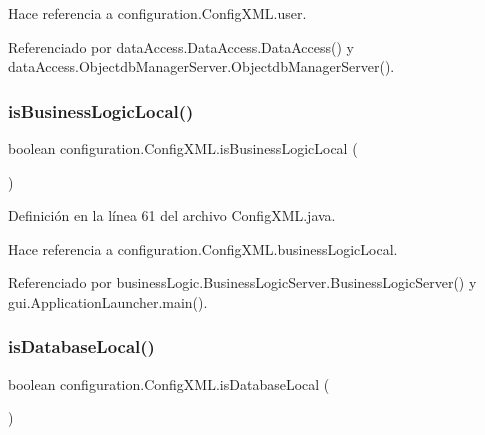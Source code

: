 Hace referencia a configuration.\+Config\+X\+M\+L.\+user.



Referenciado por data\+Access.\+Data\+Access.\+Data\+Access() y data\+Access.\+Objectdb\+Manager\+Server.\+Objectdb\+Manager\+Server().

\mbox{\label{classconfiguration_1_1_config_x_m_l_a3055cd4f61151ef6d1c48a5ebf86b33f}} 
\subsubsection{\texorpdfstring{isBusinessLogicLocal()}{isBusinessLogicLocal()}}
{\footnotesize\ttfamily boolean configuration.\+Config\+X\+M\+L.\+is\+Business\+Logic\+Local (\begin{DoxyParamCaption}{ }\end{DoxyParamCaption})}



Definición en la línea 61 del archivo Config\+X\+M\+L.\+java.


\begin{DoxyCode}{0}

\end{DoxyCode}


Hace referencia a configuration.\+Config\+X\+M\+L.\+business\+Logic\+Local.



Referenciado por business\+Logic.\+Business\+Logic\+Server.\+Business\+Logic\+Server() y gui.\+Application\+Launcher.\+main().

\mbox{\label{classconfiguration_1_1_config_x_m_l_a2ee9afbde36aa3f5c0d0158a8b5449fb}} 
\subsubsection{\texorpdfstring{isDatabaseLocal()}{isDatabaseLocal()}}
{\footnotesize\ttfamily boolean configuration.\+Config\+X\+M\+L.\+is\+Database\+Local (\begin{DoxyParamCaption}{ }\end{DoxyParamCaption})}



